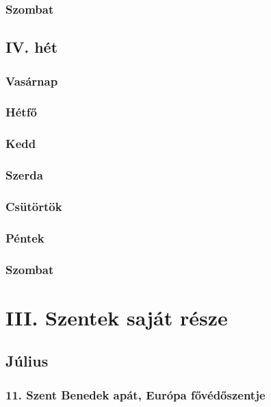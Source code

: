 \documentclass[twoside]{article}
\begin{document}
        \subsubsection*{Szombat}
            \pagebreak\null\pagebreak
    \subsection*{IV. hét}
        \subsubsection*{Vasárnap}
            \pagebreak\null\pagebreak
        \subsubsection*{Hétfő}
            \pagebreak\null\pagebreak
        \subsubsection*{Kedd}
            \pagebreak\null\pagebreak
        \subsubsection*{Szerda}
            \pagebreak\null\pagebreak
        \subsubsection*{Csütörtök}
            \pagebreak\null\pagebreak
        \subsubsection*{Péntek}
            \pagebreak\null\pagebreak
        \subsubsection*{Szombat}
            \pagebreak\null\pagebreak
\section*{III. Szentek saját része}
\setcounter{page}{1}
    \subsection*{Július}
        \subsubsection*{11. Szent Benedek apát, Európa fővédőszentje}
            \begin{gregosheet}
            \end{gregosheet}
\end{document}

